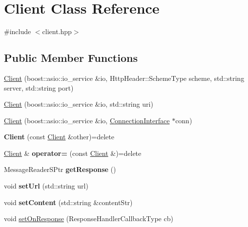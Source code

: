 \hypertarget{class_client}{}\section{Client Class Reference}
\label{class_client}


{\ttfamily \#include $<$client.\+hpp$>$}

\subsection*{Public Member Functions}
\begin{DoxyCompactItemize}
\item 
\hyperlink{class_client_afdde66898aa2cbfbdace6098de0f0800}{Client} (boost\+::asio\+::io\+\_\+service \&io, Http\+Header\+::\+Scheme\+Type scheme, std\+::string server, std\+::string port)
\item 
\hyperlink{class_client_a17e2ff6c5015bea27259c47b5948c2e7}{Client} (boost\+::asio\+::io\+\_\+service \&io, std\+::string uri)
\item 
\hyperlink{class_client_a71e7eb95dbfbf747395904e04370c3b3}{Client} (boost\+::asio\+::io\+\_\+service \&io, \hyperlink{class_connection_interface}{Connection\+Interface} $\ast$conn)
\item 
\mbox{\label{class_client_a831c9bf9b4d6907ec23a04025810693f}} 
{\bfseries Client} (const \hyperlink{class_client}{Client} \&other)=delete
\item 
\mbox{\label{class_client_a255f4905a3a0176a194e4a675d0a172b}} 
\hyperlink{class_client}{Client} \& {\bfseries operator=} (const \hyperlink{class_client}{Client} \&)=delete
\item 
\mbox{\label{class_client_a5886919756e3f0dcc4058ccb47ba44d6}} 
Message\+Reader\+S\+Ptr {\bfseries get\+Response} ()
\item 
\mbox{\label{class_client_af41106f498418bfd27f2acac18f154a5}} 
void {\bfseries set\+Url} (std\+::string url)
\item 
\mbox{\label{class_client_af1dd3726ed7b178f6adcdc97523388d3}} 
void {\bfseries set\+Content} (std\+::string \&content\+Str)
\item 
void \hyperlink{class_client_af87e3114d4bff798cc9f16169319b576}{set\+On\+Response} (Response\+Handler\+Callback\+Type cb)

\end{DoxyCompactItemize}
